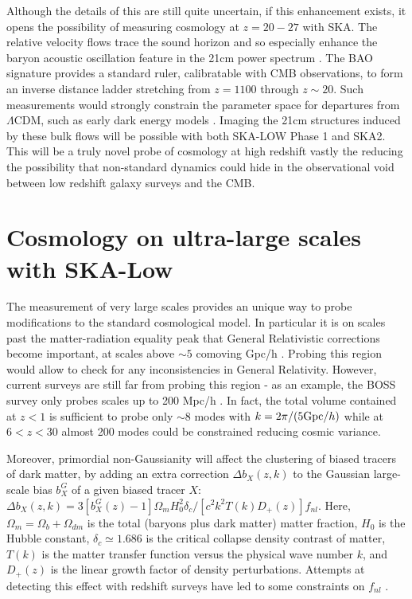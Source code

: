 \documentclass{PoS}
\newcommand{\om}{\Omega_m}
\newcommand{\ob}{\Omega_b}
\newcommand{\odm}{\Omega_{dm}}
\newcommand{\ho}{H_0}
\newcommand{\fnl}{f_{nl}}
\begin{document}
Although the details of this are still quite uncertain, if this enhancement exists, it opens the possibility of measuring cosmology at $z=20-27$ with SKA. The relative velocity flows trace the sound horizon and so especially enhance the baryon acoustic oscillation feature in the 21cm power spectrum \citep[see e.g.][]{2012ApJ...760....3M}. The BAO signature provides a standard ruler, calibratable with CMB observations, to form an inverse distance ladder stretching from $z=1100$ through $z\sim20$. Such measurements would strongly constrain the parameter space for departures from $\Lambda$CDM, such as early dark energy models \citep[e.g.][]{2006A&A...454...27B,2006JCAP...06..026D}. Imaging the 21cm structures induced by these bulk flows will be possible with both SKA-LOW Phase 1 and SKA2. This will be a truly novel probe of cosmology at high redshift vastly the reducing the possibility that non-standard dynamics could hide in the observational void between low redshift galaxy surveys and the CMB.

\section{Cosmology on ultra-large scales with SKA-Low}

The measurement of very large scales provides an unique way to probe modifications to the standard cosmological model. In particular it is on scales past the matter-radiation equality peak that General Relativistic corrections become important, at scales above $\sim 5$ comoving Gpc/h \citep{2012PhRvD..85b3504J}. Probing this region would allow to check for any inconsistencies in General Relativity. However, current surveys are still far from probing this region - as an example, the BOSS survey only probes scales up to 200 Mpc/h \citep{2012MNRAS.427.3435A}. In fact, the total volume contained at $z<1$ is sufficient to probe only $\sim8$ modes with $k=2\pi/(5{\rm Gpc}/h)$ while at $6<z<30$ almost 200 modes could be constrained reducing cosmic variance.

Moreover, primordial non-Gaussianity will affect the clustering of biased tracers of dark matter, by adding an extra correction $\Delta b_X(z,k)$ to the Gaussian large-scale bias $b_X^G$ of a given biased tracer $X$: $\Delta b_X(z,k)=3[b_X^G(z)-1]\om\ho^2\delta_c/[c^2k^2T(k)D_+(z)]\fnl$. Here, $\om=\ob+\odm$ is the total (baryons plus dark matter) matter fraction, $\ho$ is the Hubble constant, $\delta_c\simeq1.686$ is the critical collapse density contrast of matter, $T(k)$ is the matter transfer function versus the physical wave number $k$, and $D_+(z)$ is the linear growth factor of density perturbations. Attempts at detecting this effect with redshift surveys have led to some constraints on $\fnl$ \citep{2014PhRvD..89b3511G}.
\end{document}
